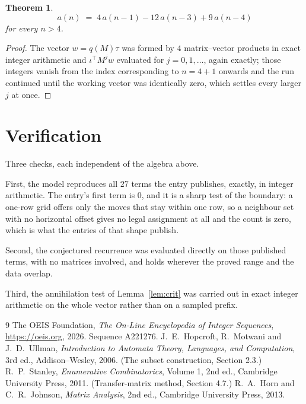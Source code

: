 \documentclass[11pt,a4paper]{article}
\theoremstyle{plain}
\newtheorem{theorem}{Theorem}
\theoremstyle{definition}
\begin{document}
\begin{theorem}
\[
a(n)\;=\;4\,a(n-1) - 12\,a(n-3) + 9\,a(n-4)
\]
for every $n>4$.
\end{theorem}

\begin{proof}
The vector $w=q(M)\tau$ was formed by $4$ matrix--vector products in exact integer
arithmetic and $\iota^{\!\top}M^{j}w$ evaluated for $j=0,1,\dots$, again exactly; those
integers vanish from the index corresponding to $n=4+1$ onwards and the run continued
until the working vector was identically zero, which settles every larger $j$ at once.
\end{proof}

\section{Verification}

Three checks, each independent of the algebra above.

First, the model reproduces all $27$ terms the entry publishes, exactly, in integer
arithmetic. The entry's first term is $0$, and it is a sharp test of the boundary: a
one-row grid offers only the moves that stay within one row, so a neighbour set with no
horizontal offset gives no legal assignment at all and the count is zero, which is what the
entries of that shape publish.

Second, the conjectured recurrence was evaluated directly on those published terms, with no
matrices involved, and holds wherever the proved range and the data overlap.

Third, the annihilation test of Lemma~\ref{lem:crit} was carried out in exact integer
arithmetic on the whole vector rather than on a sampled prefix.

\begin{thebibliography}{9}
 The OEIS Foundation, \emph{The On-Line Encyclopedia of Integer
Sequences}, \url{https://oeis.org}, 2026. Sequence A221276.
 J.~E.~Hopcroft, R.~Motwani and J.~D.~Ullman, \emph{Introduction to Automata
Theory, Languages, and Computation}, 3rd ed., Addison--Wesley, 2006. (The subset
construction, Section 2.3.)
 R.~P.~Stanley, \emph{Enumerative Combinatorics}, Volume 1, 2nd ed.,
Cambridge University Press, 2011. (Transfer-matrix method, Section 4.7.)
 R.~A.~Horn and C.~R.~Johnson, \emph{Matrix Analysis}, 2nd ed., Cambridge
University Press, 2013.
\end{thebibliography}
\end{document}

